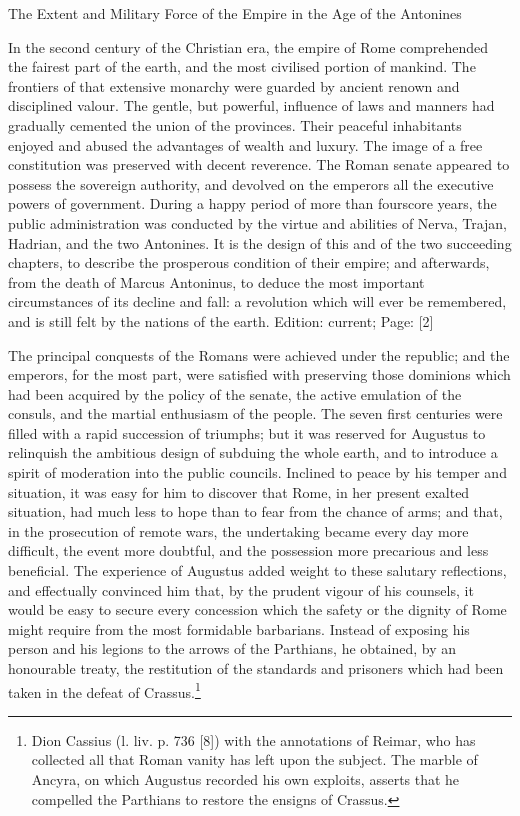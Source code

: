 
The Extent and Military Force of the Empire in the Age of the Antonines

In the second century of the Christian era, the empire of Rome comprehended the fairest part of the earth, and the most civilised portion of mankind. The frontiers of that extensive monarchy were guarded by ancient renown and disciplined valour. The gentle, but powerful, influence of laws and manners had gradually cemented the union of the provinces. Their peaceful inhabitants enjoyed and abused the advantages of wealth and luxury. The image of a free constitution was preserved with decent reverence. The Roman senate appeared to possess the sovereign authority, and devolved on the emperors all the executive powers of government. During a happy period of more than fourscore years, the public administration was conducted by the virtue and abilities of Nerva, Trajan, Hadrian, and the two Antonines. It is the design of this and of the two succeeding chapters, to describe the prosperous condition of their empire; and afterwards, from the death of Marcus Antoninus, to deduce the most important circumstances of its decline and fall: a revolution which will ever be remembered, and is still felt by the nations of the earth.
Edition: current; Page: [2]

The principal conquests of the Romans were achieved under the republic; and the emperors, for the most part, were satisfied with preserving those dominions which had been acquired by the policy of the senate, the active emulation of the consuls, and the martial enthusiasm of the people. The seven first centuries were filled with a rapid succession of triumphs; but it was reserved for Augustus to relinquish the ambitious design of subduing the whole earth, and to introduce a spirit of moderation into the public councils. Inclined to peace by his temper and situation, it was easy for him to discover that Rome, in her present exalted situation, had much less to hope than to fear from the chance of arms; and that, in the prosecution of remote wars, the undertaking became every day more difficult, the event more doubtful, and the possession more precarious and less beneficial. The experience of Augustus added weight to these salutary reflections, and effectually convinced him that, by the prudent vigour of his counsels, it would be easy to secure every concession which the safety or the dignity of Rome might require from the most formidable barbarians. Instead of exposing his person and his legions to the arrows of the Parthians, he obtained, by an honourable treaty, the restitution of the standards and prisoners which had been taken in the defeat of Crassus.\footnote{Dion Cassius (l. liv. p. 736 [8]) with the annotations of Reimar, who has collected all that Roman vanity has left upon the subject. The marble of Ancyra, on which Augustus recorded his own exploits, asserts that he compelled the Parthians to restore the ensigns of Crassus.}

